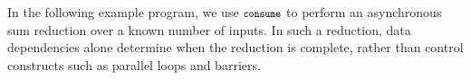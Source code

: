 


In the following example program, we use $\mbox{\footnotesize \texttt{consume}}$ to perform an
asynchronous sum reduction over a known
number of inputs.  {In such a reduction, data dependencies
alone determine when the reduction is complete, rather than control constructs
such as parallel loops and barriers.}

